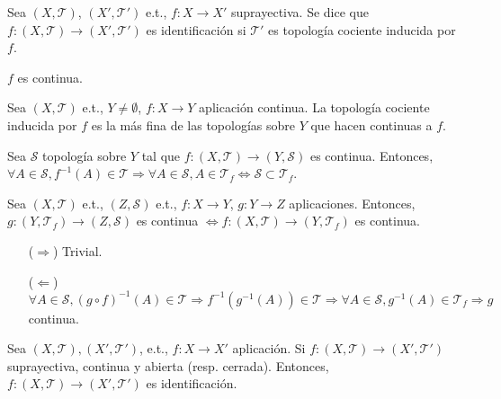 \begin{defn}[Identificación]
  Sea $( X, \mathcal{T} )$, $( X', \mathcal{T}' )$ e.t., $f: X \to X'$ suprayectiva. Se dice que $f: ( X, \mathcal{T} ) \to ( X', \mathcal{T}' )$ es identificación si $\mathcal{T}'$ es topología cociente inducida por $f$.
\end{defn}

\begin{obs}
  $f$ es continua.
\end{obs}

\begin{prop}
  Sea $( X, \mathcal{T} )$ e.t., $Y \neq \emptyset$, $f: X \to Y$ aplicación continua. La topología cociente inducida por $f$ es la más fina de las topologías sobre $Y$ que hacen continuas a $f$.
\end{prop}

\begin{dem}
  Sea $\mathcal{S}$ topología sobre $Y$ tal que $f: ( X, \mathcal{T} ) \to ( Y, \mathcal{S} )$ es continua. Entonces, $\forall A \in \mathcal{S}, f^{-1}(A) \in \mathcal{T} \Rightarrow \forall A \in \mathcal{S}, A \in \mathcal{T}_{f} \Leftrightarrow \mathcal{S} \subset \mathcal{T}_{f}$.
\end{dem}

\begin{prop}
  Sea $( X, \mathcal{T} )$ e.t., $( Z, \mathcal{S} )$ e.t., $f: X \to Y$, $g: Y \to Z$ aplicaciones. Entonces, $g: (Y, \mathcal{T}_{f}) \to (Z,\mathcal{S})$ es continua $\Leftrightarrow f: (X, \mathcal{T}) \to (Y, \mathcal{T}_{f})$ es continua.
\end{prop}
 
\begin{dem}
  \begin{enumerate}[label=(\roman*)]
    \item [($\Rightarrow$)] Trivial.
    \item [($\Leftarrow$)] $\forall A \in \mathcal{S}, (g \circ f)^{-1}(A) \in \mathcal{T} \Rightarrow f^{-1}(g^{-1}(A)) \in \mathcal{T} \Rightarrow \forall A \in \mathcal{S}, g^{-1}(A) \in \mathcal{T}_{f} \Rightarrow g$ continua.
  \end{enumerate} 
\end{dem}

\begin{prop}
  Sea $ ( X, \mathcal{T} ), ( X', \mathcal{T}' )$, e.t., $f: X \to X'$ aplicación. Si $f: ( X, \mathcal{T} ) \to ( X', \mathcal{T}' )$ suprayectiva, continua y abierta (resp. cerrada). Entonces, $f: ( X, \mathcal{T} ) \to ( X', \mathcal{T}' )$ es identificación.
\end{prop}

